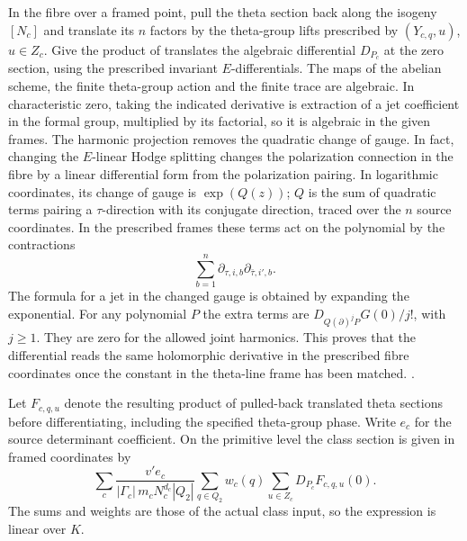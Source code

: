 In the fibre over a framed point, pull the theta section
back along the isogeny \([N_c]\) and translate its \(n\)
factors by the theta-group lifts prescribed by
\((Y_{c,q},u)\), \(u\in Z_c\).
Give the product of translates the algebraic
differential \(D_{P_c}\) at the zero section, using
the prescribed invariant \(E\)-differentials. The maps
of the abelian scheme, the finite theta-group action
and the finite trace are algebraic. In characteristic
zero, taking the indicated derivative is extraction
of a jet coefficient in the formal group, multiplied
by its factorial, so it is algebraic in the given
frames. The harmonic projection removes the quadratic
change of gauge. In fact, changing the \(E\)-linear
Hodge splitting changes the polarization connection
in the fibre by a linear differential form from the
polarization pairing. In logarithmic coordinates,
its change of gauge is \(\exp(Q(z))\); \(Q\) is the
sum of quadratic terms pairing a \(\tau\)-direction
with its conjugate direction, traced over the \(n\)
source coordinates. In the prescribed frames these
terms act on the polynomial by the contractions
\[
 \sum_{b=1}^{n}
     \partial_{\tau,i,b}\partial_{\bar\tau,i',b}.
\]
The formula for a jet in the changed gauge is obtained
by expanding the exponential. For any polynomial \(P\)
the extra terms are \(D_{Q(\partial)^jP}G(0)/j!\),
with \(j\ge1\). They are zero for the allowed joint
harmonics. This proves that the differential reads the
same holomorphic derivative in the prescribed fibre
coordinates once the constant in the theta-line frame
has been matched.
.

Let \(F_{c,q,u}\) denote the resulting product of
pulled-back translated theta sections before
differentiating, including the specified theta-group
phase. Write \(e_c\) for the source determinant
coefficient. On the primitive level the class section is
given in framed coordinates by
\begin{equation}
 \label{eq:primitive-phase-class}
 \sum_c
   \frac{v'e_c}{|\Gamma_c|\,m_cN_c^{d_c}|Q_2|}
   \sum_{q\in Q_2}w_c(q)
   \sum_{u\in Z_c} D_{P_c}F_{c,q,u}(0).
\end{equation}
The sums and weights are those of the actual class input,
so the expression is linear over \(K\).

